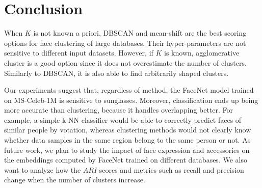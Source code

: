 \documentclass[conference]{IEEEtran}
\begin{document}
\section{Conclusion}

When $K$ is not known a priori, DBSCAN and mean-shift are the best scoring options for face clustering of large databases.
Their hyper-parameters are not sensitive to different input datasets.
However, if $K$ is known, agglomerative cluster is a good option since it does not overestimate the number of clusters.
Similarly to DBSCAN, it is also able to find arbitrarily shaped clusters.

Our experiments suggest that, regardless of method, the FaceNet model trained on MS-Celeb-1M is sensitive to sunglasses.
Moreover, classification ends up being more accurate than clustering, because it handles overlapping better.
For example, a simple k-NN classifier would be able to correctly predict faces of similar people by votation, whereas clustering methods would not clearly know whether data samples in the same region belong to the same person or not.
As future work, we plan to study the impact of face expression and accessories on the embeddings computed by FaceNet trained on different databases.
We also want to analyze how the $ARI$ scores and metrics such as recall and precision change when the number of clusters increase.
\end{document}
